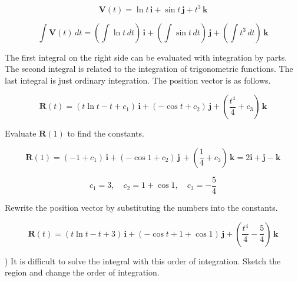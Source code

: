 \documentclass{article}
\begin{document}
\[\mathbf{V}(t)=\ln t\,\mathbf{i}+\sin t\,\mathbf{j}+t^3\,\mathbf{k}\]

\[\int\mathbf{V}(t)\,dt=\left(\int\ln t\,dt\right)\,\mathbf{i}+\left(\int\sin t\,dt\right)\,\mathbf{j}+\left(\int t^3\,dt\right)\,\mathbf{k}\]

\hfill

\noindent The first integral on the right side can be evaluated with integration by parts. The second integral is related to the integration of trigonometric functions. The last integral is just ordinary integration. The position vector is as follows.

\[\mathbf{R}(t)=(t\ln t- t+c_1)\,\mathbf{i}+(-\cos t+c_2)\,\mathbf{j}+\left(\frac{t^4}4+c_3\right)\,\mathbf{k}\]

\newpage

\noindent Evaluate $\mathbf{R}(1)$ to find the constants.

\[\mathbf{R}(1)=(-1+c_1)\,\mathbf{i}+(-\cos1+c_2)\,\mathbf{j}\,+\left(\frac14+c_3\right)\,\mathbf{k}=2\mathbf{i}+\mathbf{j}-\mathbf{k}\]

\[c_1=3,\quad c_2=1+\cos1,\quad c_3=-\frac54\]

\hfill

\noindent Rewrite the position vector by substituting the numbers into the constants.

\[\boxed{\mathbf{R}(t)=(t\ln t-t+3)\,\mathbf{i}+(-\cos t + 1 + \cos 1)\,\mathbf{j}+\left(\frac{t^4}4-\frac54\right)\,\mathbf{k}}\]

\hfill

) It is difficult to solve the integral with this order of integration. Sketch the region and change the order of integration.
\end{document}
